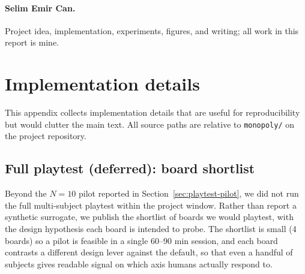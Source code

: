 \documentclass[10pt]{article}
\begin{document}
\paragraph{Selim Emir Can.} Project idea, implementation,
experiments, figures, and writing; all work in this report is
mine.




\appendix

\section{Implementation details}\label{app:impl}

This appendix collects implementation details that are useful for
reproducibility but would clutter the main text. All source paths
are relative to \texttt{monopoly/} on the project repository.

\subsection{Full playtest (deferred): board shortlist}\label{app:playtest-shortlist}

Beyond the $N{=}10$ pilot reported in
Section~\ref{sec:playtest-pilot}, we did not run the full
multi-subject playtest within the project window. Rather than
report a synthetic surrogate, we publish the shortlist of boards
we would playtest, with the design hypothesis each board is
intended to probe. The shortlist is small (4 boards) so a pilot
is feasible in a single 60--90 min session, and each board
contrasts a different design lever against the default, so that
even a handful of subjects gives readable signal on which axis
humans actually respond to.
\end{document}
